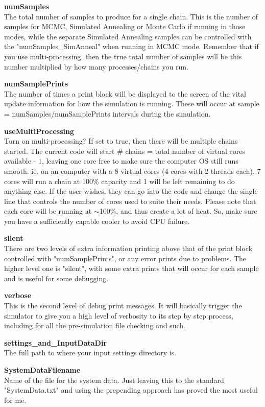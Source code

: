 \documentclass[12pt,preprint]{aastex}
\begin{document}
{\bf numSamples}\\
The total number of samples to produce for a single chain.  This is the number of samples for MCMC, Simulated Annealing or Monte Carlo if running in those modes, while the separate Simulated Annealing samples can be controlled with the "numSamples\_SimAnneal" when running in MCMC mode.  Remember that if you use multi-processing, then the true total number of samples will be this number multiplied by how many processes/chains you run.

{\bf numSamplePrints}\\
The number of times a print block will be displayed to the screen of the vital update information for how the simulation is running.  These will occur at sample = numSamples/numSamplePrints intervals during the simulation.

{\bf useMultiProcessing}\\
Turn on multi-processing?  If set to true, then there will be multiple chains started.  The current code will start \# chains = total number of virtual cores available - 1, leaving one core free to make sure the computer OS still runs smooth. ie. on an computer with a 8 virtual cores (4 cores with 2 threads each), 7 cores will run a chain at 100\% capacity and 1 will be left remaining to do anything else.  If the user wishes, they can go into the code and change the single line that controls the number of cores used to suite their needs.  Please note that each core will be running at $\sim$100\%, and thus create a lot of heat.  So, make sure you have a sufficiently capable cooler to avoid CPU failure.

{\bf silent}\\
There are two levels of extra information printing above that of the print block controlled with "numSamplePrints", or any error prints due to problems.  The higher level one is "silent", with some extra prints that will occur for each sample and is useful for some debugging.

{\bf verbose}\\
This is the second level of debug print messages.  It will basically trigger the simulator to give you a high level of verbosity to its step by step process, including for all the pre-simulation file checking and such.

{\bf settings\_and\_InputDataDir}\\
The full path to where your input settings directory is.  

{\bf SystemDataFilename}\\
Name of the file for the system data.  Just leaving this to the standard "SystemData.txt" and using the prepending approach has proved the most useful for me.
\end{document}
